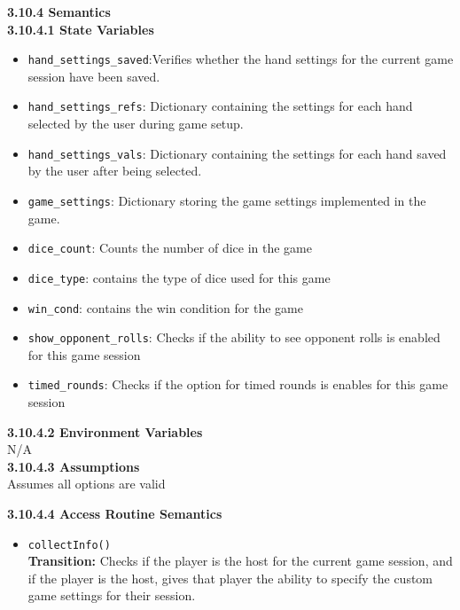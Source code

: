 \documentclass[12pt, titlepage]{article}
\begin{document}
\noindent \textbf{3.10.4 Semantics}\\
\textbf{3.10.4.1 State Variables}\\
\begin{itemize}
	\item \texttt{hand\_settings\_saved}:Verifies whether the hand settings for the current game session have been saved.
	\item \texttt{hand\_settings\_refs}: Dictionary containing the settings for each hand selected by the user during game setup.
	\item \texttt{hand\_settings\_vals}: Dictionary containing the settings for each hand saved by the user after being selected.
	\item \texttt{game\_settings}: Dictionary storing the game settings implemented in the game.
	\item \texttt{dice\_count}: Counts the number of dice in the game
	\item \texttt{dice\_type}: contains the type of dice used for this game
	\item \texttt{win\_cond}: contains the win condition for the game
	\item \texttt{show\_opponent\_rolls}: Checks if the ability to see opponent rolls is enabled for this game session
	\item \texttt{timed\_rounds}: Checks if the option for timed rounds is enables for this game session

\end{itemize}

\textbf{3.10.4.2 Environment Variables}\\

N/A\\

\textbf{3.10.4.3 Assumptions}\\
Assumes all options are valid 

\textbf{3.10.4.4 Access Routine Semantics}
\begin{itemize}

	\item \texttt{collectInfo()}\\
	\textbf{Transition:} Checks if the player is the host for the current game session, and if the player is the host, gives that player the ability to specify the custom game settings for their session.

\end{itemize}
\end{document}
